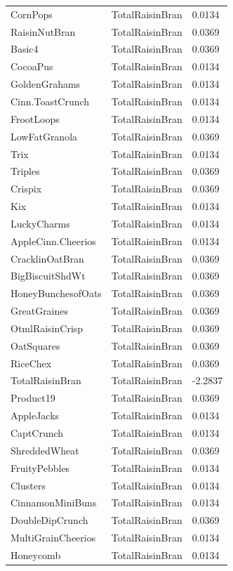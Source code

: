 \begin{table}[!htbp]
\begin{tabular}{lll}
CornPops & TotalRaisinBran & 0.0134
\\
RaisinNutBran & TotalRaisinBran & 0.0369
\\
Basic4 & TotalRaisinBran & 0.0369
\\
CocoaPus & TotalRaisinBran & 0.0134
\\
GoldenGrahams & TotalRaisinBran & 0.0134
\\
Cinn.ToastCrunch & TotalRaisinBran & 0.0134
\\
FrootLoops & TotalRaisinBran & 0.0134
\\
LowFatGranola & TotalRaisinBran & 0.0369
\\
Trix & TotalRaisinBran & 0.0134
\\
Triples & TotalRaisinBran & 0.0369
\\
Crispix & TotalRaisinBran & 0.0369
\\
Kix & TotalRaisinBran & 0.0134
\\
LuckyCharms & TotalRaisinBran & 0.0134
\\
AppleCinn.Cheerios & TotalRaisinBran & 0.0134
\\
CracklinOatBran & TotalRaisinBran & 0.0369
\\
BigBiscuitShdWt & TotalRaisinBran & 0.0369
\\
HoneyBunchesofOats & TotalRaisinBran & 0.0369
\\
GreatGraines & TotalRaisinBran & 0.0369
\\
OtmlRaisinCrisp & TotalRaisinBran & 0.0369
\\
OatSquares & TotalRaisinBran & 0.0369
\\
RiceChex & TotalRaisinBran & 0.0369
\\
TotalRaisinBran & TotalRaisinBran & -2.2837
\\
Product19 & TotalRaisinBran & 0.0369
\\
AppleJacks & TotalRaisinBran & 0.0134
\\
CaptCrunch & TotalRaisinBran & 0.0134
\\
ShreddedWheat & TotalRaisinBran & 0.0369
\\
FruityPebbles & TotalRaisinBran & 0.0134
\\
Clusters & TotalRaisinBran & 0.0134
\\
CinnamonMiniBuns & TotalRaisinBran & 0.0134
\\
DoubleDipCrunch & TotalRaisinBran & 0.0369
\\
MultiGrainCheerios & TotalRaisinBran & 0.0134
\\
Honeycomb & TotalRaisinBran & 0.0134
\\

\end{tabular}
\end{table}
